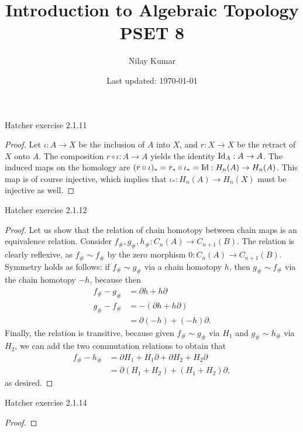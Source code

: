 \documentclass{../../mathnotes}
\title{Introduction to Algebraic Topology PSET 8}
\author{Nilay Kumar}
\date{Last updated: \today}
\begin{document}
\maketitle

\begin{prop}
    Hatcher exercise 2.1.11 
\end{prop}
\begin{proof}
    Let $\iota:A\to X$ be the inclusion of $A$ into $X$, and $r:X\to X$ be the retract of $X$ onto $A$.
    The composition $r\circ \iota:A\to A$ yields the identity $\operatorname{Id}_A:A\to A$. The induced maps on the homology are
    $(r\circ\iota)_*=r_*\circ\iota_*=\operatorname{Id}:H_n(A)\to H_n(A)$. This map is of course injective, which implies that
    $\iota_*:H_n(A)\to H_n(X)$ must be injective as well.
\end{proof}

\begin{prop}
    Hatcher exercise 2.1.12
\end{prop}
\begin{proof}
    Let us show that the relation of chain homotopy between chain maps is an equivalence relation.
    Consider $f_\#,g_\#,h_\#:C_n(A)\to C_{n+1}(B)$. The relation is clearly reflexive, as $f_\#\sim f_\#$
    by the zero morphism $0:C_n(A)\to C_{n+1}(B)$. Symmetry holds as follows: if $f_\#\sim g_\#$ via a
    chain homotopy $h$, then $g_\#\sim f_\#$ via the chain homotopy $-h$, because then 
    \begin{align*}
        f_\#-g_\#&=\partial h+h\partial\\
        g_\#-f_\#&=-(\partial h+h\partial)\\
        &=\partial (-h)+(-h)\partial.
    \end{align*}
    Finally, the relation is transitive, because given $f_\#\sim g_\#$ via $H_1$ and $g_\#\sim h_\#$
    via $H_2$, we can add the two commutation relations to obtain that
    \begin{align*}
        f_\#-h_\#&=\partial H_1+H_1\partial+\partial H_2+H_2\partial\\
        &=\partial(H_1+H_2)+(H_1+H_2)\partial,
    \end{align*}
    as desired.
\end{proof}

\begin{prop}
    Hatcher exercise 2.1.14
\end{prop}
\begin{proof}
    
\end{proof}
\end{document}
